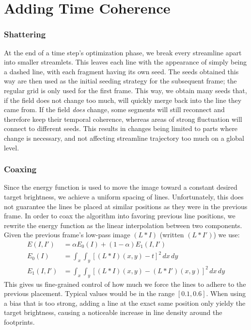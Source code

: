 \section*{Adding Time Coherence}
\subsubsection*{Shattering}
At the end of a time step's optimization phase, we break every streamline apart into smaller streamlets.
This leaves each line with the appearance of simply being a dashed line, with each fragment having its own seed.
The seeds obtained this way are then used as the initial seeding strategy for the subsequent frame; the regular grid is only used for the first frame.
This way, we obtain many seeds that, if the field does not change too much, will quickly merge back into the line they came from.
If the field \textit{does} change, some segments will still reconnect and therefore keep their temporal coherence,
whereas areas of strong fluctuation will connect to different seeds.
This results in changes being limited to parts where change is necessary, and not affecting streamline trajectory too much on a global level.

\subsubsection*{Coaxing}
Since the energy function is used to move the image toward a constant desired target brightness, we achieve a uniform spacing of lines.
Unfortunately, this does not guarantee the lines be placed at similar positions as they were in the previous frame.
In order to coax the algorithm into favoring previous line positions, we rewrite the energy function as the linear
interpolation between two components. Given the previous frame's low-pass image $(L\ast I)$ (written $(L\ast I')$) we use: %
\begin{equation*}
    \begin{split}
        E(I, I')   &= \alpha E_0(I)+(1-\alpha)E_1(I, I')\\
        E_0(I)     &= \int_x\int_y\left[(L\ast I)(x,y)-t\right]^2\,dx\,dy\\
        E_1(I, I') &= \int_x\int_y\left[(L\ast I)(x,y)-(L\ast I')(x,y)\right]^2\,dx\,dy
    \end{split}
\end{equation*}
This gives us fine-grained control of how much we force the lines to adhere to the previous placement.
Typical values would be in the range $[0.1, 0.6]$.
When using a bias that is too strong, adding a line at the exact same position only yieldy the target brightness,
causing a noticeable increase in line density around the footprints.\\
